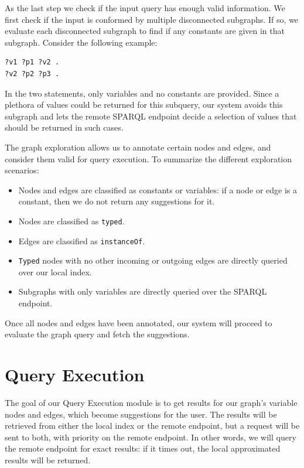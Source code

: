 As the last step we check if the input query has enough valid information. We first check if the input is conformed by multiple disconnected subgraphs. If so, we evaluate each disconnected subgraph to find if any constants are given in that subgraph. Consider the following example: 
\begin{verbatim}
?v1 ?p1 ?v2 . 
?v2 ?p2 ?p3 .
\end{verbatim}
In the two statements, only variables and no constants are provided.
Since a plethora of values could be returned for this subquery, our system avoids this subgraph and lets the remote SPARQL endpoint decide a selection of values that should be returned in such cases.

The graph exploration allows us to annotate certain nodes and edges, and consider them valid for query execution. To summarize the different exploration scenarios:
\begin{itemize}
    \item Nodes and edges are classified as constants or variables: if a node or edge is a constant, then we do not return any suggestions for it.
    \item Nodes are classified as \texttt{typed}.
    \item Edges are classified as \texttt{instanceOf}.
    \item \texttt{Typed} nodes with no other incoming or outgoing edges are directly queried over our local index.
    \item Subgraphs with only variables are directly queried over the SPARQL endpoint.
\end{itemize}

Once all nodes and edges have been annotated, our system will proceed to evaluate the graph query and fetch the suggestions. 


\section{Query Execution}
\label{chap:execution}

The goal of our Query Execution module is to get results for our graph's variable nodes and edges, which become suggestions for the user. The results will be retrieved from either the local index or the remote endpoint, but a request will be sent to both, with priority on the remote endpoint. In other words, we will query the remote endpoint for exact results: if it times out, the local approximated results will be returned.

